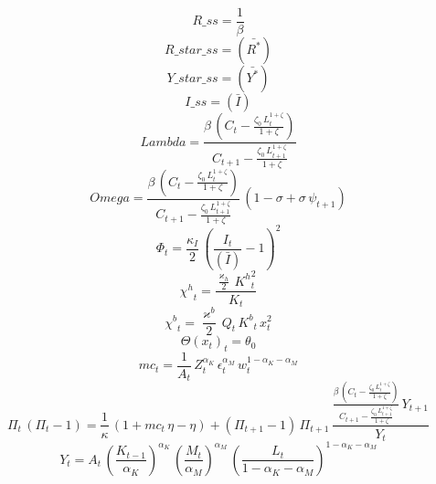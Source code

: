 \begin{dmath*}
R\_ss = \frac{1}{{\beta}}
\end{dmath*}
\begin{dmath*}
R\_star\_ss = (\bar{R^{*}})
\end{dmath*}
\begin{dmath*}
Y\_star\_ss = (\bar{Y^{*}})
\end{dmath*}
\begin{dmath*}
I\_ss = (\bar{I})
\end{dmath*}
\begin{dmath*}
Lambda = \frac{{\beta}\, \left({C}_{t}-\frac{{\zeta_{0}}\, {L}_{t}^{1+{\zeta}}}{1+{\zeta}}\right)}{{C}_{t+1}-\frac{{\zeta_{0}}\, {L}_{t+1}^{1+{\zeta}}}{1+{\zeta}}}
\end{dmath*}
\begin{dmath*}
Omega = \frac{{\beta}\, \left({C}_{t}-\frac{{\zeta_{0}}\, {L}_{t}^{1+{\zeta}}}{1+{\zeta}}\right)}{{C}_{t+1}-\frac{{\zeta_{0}}\, {L}_{t+1}^{1+{\zeta}}}{1+{\zeta}}}\, \left(1-{\sigma}+{\sigma}\, {\psi}_{t+1}\right)
\end{dmath*}
\begin{dmath}
{\Phi}_{t}=\frac{{\kappa_{I}}}{2}\, \left(\frac{{I}_{t}}{(\bar{I})}-1\right)^{2}
\end{dmath}
\begin{dmath}
{\chi^{h}}_{t}=\frac{\frac{{\varkappa_{h}}}{2}\, {K^{h}}_{t}^{2}}{{K}_{t}}
\end{dmath}
\begin{dmath}
{\chi^{b}}_{t}=\frac{{\varkappa^{b}}}{2}\, {Q}_{t}\, {K^{b}}_{t}\, {x}_{t}^{2}
\end{dmath}
\begin{dmath}
{\Theta(x_{t})}_{t}={\theta_{0}}
\end{dmath}
\begin{dmath}
{mc}_{t}=\frac{1}{{A}_{t}}\, {Z}_{t}^{{\alpha_{K}}}\, {\epsilon}_{t}^{{\alpha_{M}}}\, {w}_{t}^{1-{\alpha_{K}}-{\alpha_{M}}}
\end{dmath}
\begin{dmath}
{\Pi}_{t}\, \left({\Pi}_{t}-1\right)=\frac{1}{{\kappa}}\, \left(1+{mc}_{t}\, {\eta}-{\eta}\right)+\left({\Pi}_{t+1}-1\right)\, {\Pi}_{t+1}\, \frac{\frac{{\beta}\, \left({C}_{t}-\frac{{\zeta_{0}}\, {L}_{t}^{1+{\zeta}}}{1+{\zeta}}\right)}{{C}_{t+1}-\frac{{\zeta_{0}}\, {L}_{t+1}^{1+{\zeta}}}{1+{\zeta}}}\, {Y}_{t+1}}{{Y}_{t}}
\end{dmath}
\begin{dmath}
{Y}_{t}={A}_{t}\, \left(\frac{{K}_{t-1}}{{\alpha_{K}}}\right)^{{\alpha_{K}}}\, \left(\frac{{M}_{t}}{{\alpha_{M}}}\right)^{{\alpha_{M}}}\, \left(\frac{{L}_{t}}{1-{\alpha_{K}}-{\alpha_{M}}}\right)^{1-{\alpha_{K}}-{\alpha_{M}}}
\end{dmath}
